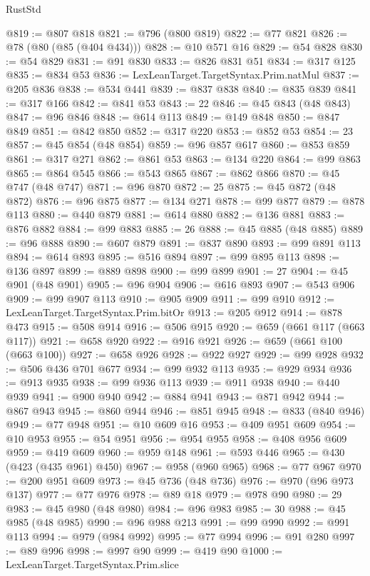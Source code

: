 \begin{lexlean}{RustStd}
\begin{coremodule}
@819 := @807 @818
@821 := @796 (@800 @819)
@822 := @77 @821
@826 := @78 (@80 (@85 (@404 @434)))
@828 := @10 @571 @16
@829 := @54 @828
@830 := @54 @829
@831 := @91 @830
@833 := @826 @831 @51
@834 := @317 @125
@835 := @834 @53
@836 := LexLeanTarget.TargetSyntax.Prim.natMul
@837 := @205 @836
@838 := @534 @441
@839 := @837 @838
@840 := @835 @839
@841 := @317 @166
@842 := @841 @53
@843 := 22
@846 := @45 @843 (@48 @843)
@847 := @96 @846
@848 := @614 @113
@849 := @149 @848
@850 := @847 @849
@851 := @842 @850
@852 := @317 @220
@853 := @852 @53
@854 := 23
@857 := @45 @854 (@48 @854)
@859 := @96 @857 @617
@860 := @853 @859
@861 := @317 @271
@862 := @861 @53
@863 := @134 @220
@864 := @99 @863
@865 := @864 @545
@866 := @543 @865
@867 := @862 @866
@870 := @45 @747 (@48 @747)
@871 := @96 @870
@872 := 25
@875 := @45 @872 (@48 @872)
@876 := @96 @875
@877 := @134 @271
@878 := @99 @877
@879 := @878 @113
@880 := @440 @879
@881 := @614 @880
@882 := @136 @881
@883 := @876 @882
@884 := @99 @883
@885 := 26
@888 := @45 @885 (@48 @885)
@889 := @96 @888
@890 := @607 @879
@891 := @837 @890
@893 := @99 @891 @113
@894 := @614 @893
@895 := @516 @894
@897 := @99 @895 @113
@898 := @136 @897
@899 := @889 @898
@900 := @99 @899
@901 := 27
@904 := @45 @901 (@48 @901)
@905 := @96 @904
@906 := @616 @893
@907 := @543 @906
@909 := @99 @907 @113
@910 := @905 @909
@911 := @99 @910
@912 := LexLeanTarget.TargetSyntax.Prim.bitOr
@913 := @205 @912
@914 := @878 @473
@915 := @508 @914
@916 := @506 @915
@920 := @659 (@661 @117 (@663 @117))
@921 := @658 @920
@922 := @916 @921
@926 := @659 (@661 @100 (@663 @100))
@927 := @658 @926
@928 := @922 @927
@929 := @99 @928
@932 := @506 @436 @701 @677
@934 := @99 @932 @113
@935 := @929 @934
@936 := @913 @935
@938 := @99 @936 @113
@939 := @911 @938
@940 := @440 @939
@941 := @900 @940
@942 := @884 @941
@943 := @871 @942
@944 := @867 @943
@945 := @860 @944
@946 := @851 @945
@948 := @833 (@840 @946)
@949 := @77 @948
@951 := @10 @609 @16
@953 := @409 @951 @609
@954 := @10 @953
@955 := @54 @951
@956 := @954 @955
@958 := @408 @956 @609
@959 := @419 @609
@960 := @959 @148
@961 := @593 @446
@965 := @430 (@423 (@435 @961) @450)
@967 := @958 (@960 @965)
@968 := @77 @967
@970 := @200 @951 @609
@973 := @45 @736 (@48 @736)
@976 := @970 (@96 @973 @137)
@977 := @77 @976
@978 := @89 @18
@979 := @978 @90
@980 := 29
@983 := @45 @980 (@48 @980)
@984 := @96 @983
@985 := 30
@988 := @45 @985 (@48 @985)
@990 := @96 @988 @213
@991 := @99 @990
@992 := @991 @113
@994 := @979 (@984 @992)
@995 := @77 @994
@996 := @91 @280
@997 := @89 @996
@998 := @997 @90
@999 := @419 @90
@1000 := LexLeanTarget.TargetSyntax.Prim.slice

\end{coremodule}
\end{lexlean}
